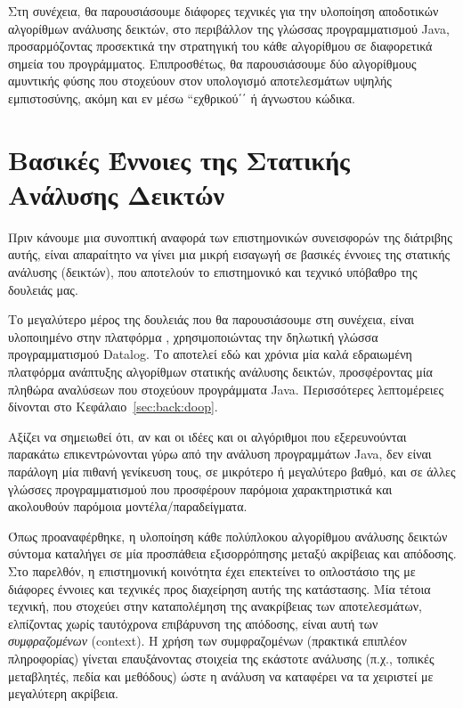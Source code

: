 Στη συνέχεια, θα παρουσιάσουμε διάφορες τεχνικές για την υλοποίηση αποδοτικών αλγορίθμων ανάλυσης δεικτών, στο περιβάλλον της γλώσσας προγραμματισμού {\en Java}, προσαρμόζοντας προσεκτικά την στρατηγική του κάθε αλγορίθμου σε διαφορετικά σημεία του προγράμματος. Επιπροσθέτως, θα παρουσιάσουμε δύο αλγορίθμους αμυντικής φύσης που στοχεύουν στον υπολογισμό αποτελεσμάτων υψηλής εμπιστοσύνης, ακόμη και εν μέσω ``εχθρικού΄΄ ή άγνωστου κώδικα.


\section*{Βασικές Έννοιες της Στατικής Ανάλυσης Δεικτών}

Πριν κάνουμε μια συνοπτική αναφορά των επιστημονικών συνεισφορών της διάτριβης αυτής, είναι απαραίτητο να γίνει μια μικρή εισαγωγή σε βασικές έννοιες της στατικής ανάλυσης (δεικτών), που αποτελούν το επιστημονικό και τεχνικό υπόβαθρο της δουλειάς μας.

Το μεγαλύτερο μέρος της δουλειάς που θα παρουσιάσουμε στη συνέχεια, είναι υλοποιημένο στην πλατφόρμα {\en \doop{}}\cite{oopsla:2009:Bravenboer}, χρησιμοποιώντας την δηλωτική γλώσσα προγραμματισμού {\en Datalog}. Το {\en \doop{}} αποτελεί εδώ και χρόνια μία καλά εδραιωμένη πλατφόρμα ανάπτυξης αλγορίθμων στατικής ανάλυσης δεικτών, προσφέροντας μία πληθώρα αναλύσεων που στοχεύουν προγράμματα {\en Java}. Περισσότερες λεπτομέρειες δίνονται στο Κεφάλαιο~\ref{sec:back:doop}.

Αξίζει να σημειωθεί ότι, αν και οι ιδέες και οι αλγόριθμοι που εξερευνούνται παρακάτω επικεντρώνονται γύρω από την ανάλυση προγραμμάτων {\en Java}, δεν είναι παράλογη μία πιθανή γενίκευση τους, σε μικρότερο ή μεγαλύτερο βαθμό, και σε άλλες γλώσσες προγραμματισμού που προσφέρουν παρόμοια χαρακτηριστικά και ακολουθούν παρόμοια μοντέλα/παραδείγματα.


Όπως προαναφέρθηκε, η υλοποίηση κάθε πολύπλοκου αλγορίθμου ανάλυσης δεικτών σύντομα καταλήγει σε μία προσπάθεια εξισορρόπησης μεταξύ ακρίβειας και απόδοσης. Στο παρελθόν, η επιστημονική κοινότητα έχει επεκτείνει το οπλοστάσιο της με διάφορες έννοιες και τεχνικές προς διαχείρηση αυτής της κατάστασης. Μία τέτοια τεχνική, που στοχεύει στην καταπολέμηση της ανακρίβειας των αποτελεσμάτων, ελπίζοντας χωρίς ταυτόχρονα επιβάρυνση της απόδοσης, είναι αυτή των \emph{συμφραζομένων} ({\en context}). Η χρήση των συμφραζομένων (πρακτικά επιπλέον πληροφορίας) γίνεται επαυξάνοντας στοιχεία της εκάστοτε ανάλυσης (π.χ., τοπικές μεταβλητές, πεδία και μεθόδους) ώστε η ανάλυση να καταφέρει να τα χειριστεί με μεγαλύτερη ακρίβεια.

